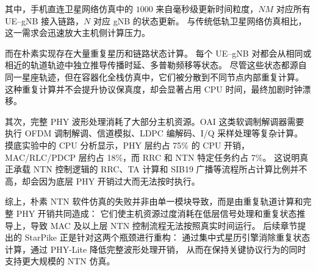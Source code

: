 其中，手机直连卫星网络仿真中的 $1000$ 来自毫秒级更新时间粒度，$NM$ 对应所有 UE--gNB 接入链路，$N$ 对应 gNB 的状态更新。
与传统低轨卫星网络仿真相比，这一需求会迅速放大主机侧计算压力。

而在朴素实现存在大量重复星历和链路状态计算。
每个 UE--gNB 对都会从相同或相近的轨道轨迹中独立推导传播时延、多普勒频移等状态。
尽管这些状态都源自同一星座轨迹，但在容器化全栈仿真中，它们被分散到不同节点内部重复计算。
这种重复计算并不会提升协议保真度，却会显著占用 CPU 时间，最终加剧时钟漂移。

其次，完整 PHY 波形处理消耗了大部分主机资源。OAI 这类软调制解调器需要执行 OFDM 调制解调、信道模拟、LDPC 编解码、I/Q 采样处理等复杂计算。
摸底实验中的 CPU 分析显示，PHY 层约占 75\% 的 CPU 开销，MAC/RLC/PDCP 层约占 18\%，而 RRC 和 NTN 特定任务约占 7\%。
这说明真正承载 NTN 控制逻辑的 RRC、TA 计算和 SIB19 广播等流程所占计算比例并不高，却会因为底层 PHY 开销过大而无法按时执行。

综上，朴素 NTN 软件仿真的失败并非由单一模块导致，而是由重复轨道计算和完整 PHY 开销共同造成：
它们使主机资源过度消耗在低层信号处理和重复状态推导上，导致 MAC 及以上层 NTN 控制流程无法按照真实时间运行。
后续章节提出的 StarPike 正是针对这两个瓶颈进行重构：
通过集中式星历引擎消除重复状态计算，通过 PHY-Lite 降低完整波形处理开销，
从而在保持关键协议行为的同时支持更大规模的 NTN 仿真。
